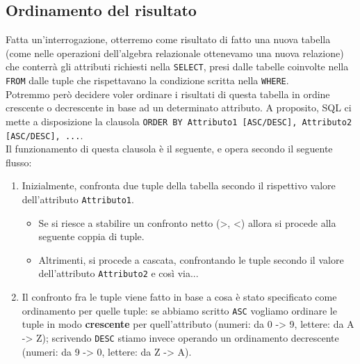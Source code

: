 \documentclass[12pt]{report}
\begin{document}
	\subsection{Ordinamento del risultato}
	Fatta un'interrogazione, otterremo come risultato di fatto una nuova tabella (come nelle operazioni dell'algebra relazionale ottenevamo una nuova relazione) che conterrà gli attributi richiesti nella \texttt{SELECT}, presi dalle tabelle coinvolte nella \texttt{FROM} dalle tuple che rispettavano la condizione scritta nella \texttt{WHERE}.\\
	Potremmo però decidere voler ordinare i risultati di questa tabella in ordine crescente o decrescente in base ad un determinato attributo. A proposito, SQL ci mette a disposizione la clausola \texttt{ORDER BY Attributo1 [ASC/DESC], Attributo2 [ASC/DESC], ...}.\\
	Il funzionamento di questa clausola è il seguente, e opera secondo il seguente flusso:
	\begin{enumerate}
		\item Inizialmente, confronta due tuple della tabella secondo il rispettivo valore dell'attributo \texttt{Attributo1}.
		\begin{itemize}
			\item Se si riesce a stabilire un confronto netto (>, <) allora si procede alla seguente coppia di tuple.
			
			\item Altrimenti, si procede a cascata, confrontando le tuple secondo il valore dell'attributo \texttt{Attributo2} e così via...
		\end{itemize}
		
		\item Il confronto fra le tuple viene fatto in base a cosa è stato specificato come ordinamento per quelle tuple: se abbiamo scritto \texttt{ASC} vogliamo ordinare le tuple in modo \textbf{crescente} per quell'attributo (numeri: da 0 -> 9, lettere: da A -> Z); scrivendo \texttt{DESC} stiamo invece operando un ordinamento decrescente (numeri: da 9 -> 0, lettere: da Z -> A).
	\end{enumerate}
	
\end{document}

